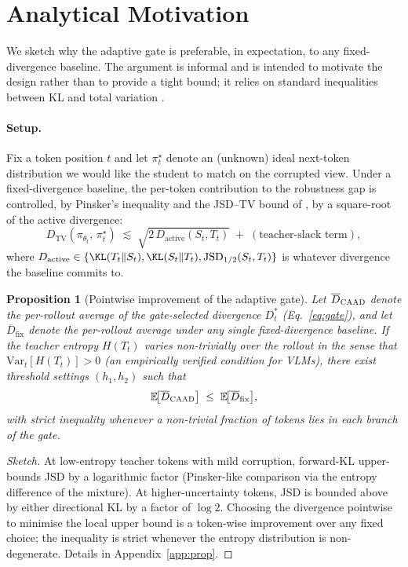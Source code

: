 \documentclass{article}
\newtheorem{proposition}{Proposition}
\newcommand{\JSD}{\mathrm{JSD}}
\newcommand{\TV}{D_{\mathrm{TV}}}
\newcommand{\student}{\pi_\theta}
\newcommand{\caad}{\textsc{CAAD}}
\begin{document}
\section{Analytical Motivation}
\label{sec:theory}

We sketch why the adaptive gate is preferable, in expectation, to any fixed-divergence baseline. The argument is informal and is intended to motivate the design rather than to provide a tight bound; it relies on standard inequalities between KL and total variation \citep{lin1991divergence}.

\paragraph{Setup.}
Fix a token position $t$ and let $\pi^\star_t$ denote an (unknown) ideal next-token distribution we would like the student to match on the corrupted view. Under a fixed-divergence baseline, the per-token contribution to the robustness gap is controlled, by Pinsker's inequality and the JSD--TV bound of \citet{lin1991divergence}, by a square-root of the active divergence:
\[
\TV(\student_t,\, \pi^\star_t) \;\lesssim\; \sqrt{2\,D_{\text{active}}(S_t, T_t)} \;+\; (\text{teacher-slack term}),
\]
where $D_{\text{active}} \in \{\KL(T_t\|S_t), \KL(S_t\|T_t), \JSD_{1/2}(S_t, T_t)\}$ is whatever divergence the baseline commits to.

\begin{proposition}[Pointwise improvement of the adaptive gate]
\label{prop:adaptive}
Let $\overline{D}_{\caad}$ denote the per-rollout average of the gate-selected divergence $D^*_t$ (Eq.~\ref{eq:gate}), and let $\overline{D}_{\text{fix}}$ denote the per-rollout average under any single fixed-divergence baseline. If the teacher entropy $H(T_t)$ varies non-trivially over the rollout in the sense that $\mathrm{Var}_t[H(T_t)] > 0$ (an empirically verified condition for VLMs), there exist threshold settings $(h_1, h_2)$ such that
\[
\mathbb{E}\!\big[\overline{D}_{\caad}\big] \;\le\; \mathbb{E}\!\big[\overline{D}_{\text{fix}}\big],
\]
with strict inequality whenever a non-trivial fraction of tokens lies in each branch of the gate.
\end{proposition}

\begin{proof}[Sketch]
At low-entropy teacher tokens with mild corruption, forward-KL upper-bounds JSD by a logarithmic factor (Pinsker-like comparison via the entropy difference of the mixture). At higher-uncertainty tokens, JSD is bounded above by either directional KL by a factor of $\log 2$. Choosing the divergence pointwise to minimise the local upper bound is a token-wise improvement over any fixed choice; the inequality is strict whenever the entropy distribution is non-degenerate. Details in Appendix~\ref{app:prop}.
\end{proof}
\end{document}
